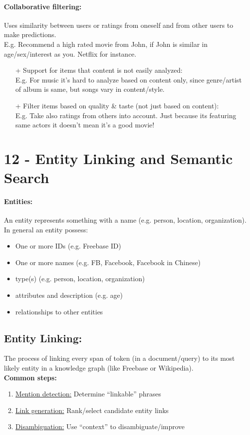 \documentclass[a4paper,11pt]{article}
\newcommand{\msection}[1]{\section{#1}\vspace{-0.5mm}}
\begin{document}
\begin{multicols}{2}
\paragraph{Collaborative filtering:} Uses similarity between users or ratings from oneself and from other users to make predictions.\\
E.g. Recommend a high rated movie from John, if John is similar in age/sex/interest as you. Netflix for instance.
\begin{itemize}
  \item[+] Support for items that content is not easily analyzed:\\
  E.g. For music it's hard to analyze based on content only, since genre/artist of album is same, but songs vary in content/style.
  \item[+] Filter items based on quality \& taste (not just based on content):\\
  E.g. Take also ratings from others into account. Just because its featuring same actors it doesn't mean it's a good movie!
\end{itemize}

\msection{12 - Entity Linking and Semantic Search}
\paragraph{Entities:} An entity represents something with a name (e.g. person, location, organization). In general an entity possess:
\begin{itemize}
  \item One or more IDs (e.g. Freebase ID)
  \item One or more names (e.g. FB, Facebook, Facebook in Chinese)
  \item type(s) (e.g. person, location, organization)
  \item attributes and description (e.g. age)
  \item relationships to other entities
\end{itemize}

\subsection{Entity Linking:} 
The process of linking every span of token (in a document/query) to its most likely entity in a knowledge graph (like Freebase or Wikipedia). \\

\textbf{Common steps:}
\begin{enumerate}
  \item \underline{Mention detection:} Determine ``linkable'' phrases
  \item \underline{Link generation:} Rank/select candidate entity links
  \item \underline{Disambiguation:} Use ``context'' to disambiguate/improve
\end{enumerate}


\end{multicols}
\end{document}

